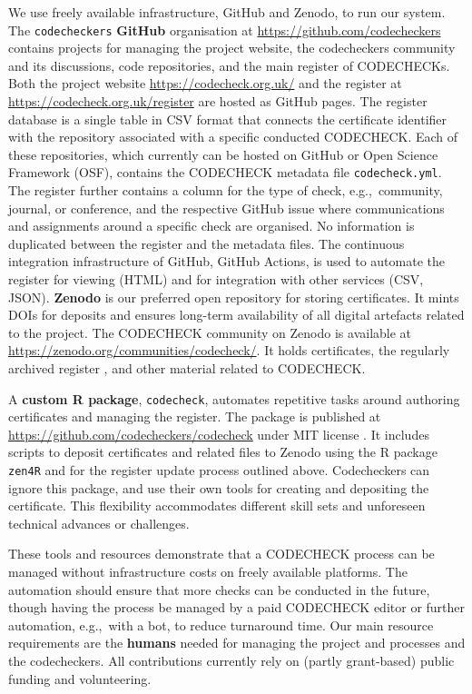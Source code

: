 \documentclass[12pt]{article}
\begin{document}
We use freely available infrastructure, GitHub and Zenodo, to run our
system.  The \texttt{codecheckers} \textbf{GitHub}
organisation at \url{https://github.com/codecheckers} contains
projects for managing the project website, the codecheckers community
and its discussions, code repositories, and the main register of
CODECHECKs. Both the project website \url{https://codecheck.org.uk/}
and the register at \url{https://codecheck.org.uk/register}
are hosted as GitHub pages.
The register database is a single table in CSV format that connects the
certificate identifier with the repository associated with a specific
conducted CODECHECK. Each of these repositories, which currently can
be hosted on GitHub or Open Science Framework (OSF), contains the
CODECHECK metadata file \texttt{codecheck.yml}. The register further
contains a column for the type of check, e.g.,~community, journal, or
conference, and the respective GitHub issue where communications and
assignments around a specific check are organised. No information is
duplicated between the register and the metadata files. The continuous
integration infrastructure of GitHub, GitHub Actions, is used to
automate the register for viewing (HTML) and for integration with
other services (CSV, JSON).  \textbf{Zenodo} is our preferred open repository for
storing certificates. It mints DOIs for deposits and ensures
long-term availability of all digital artefacts related to the
project. The CODECHECK community on Zenodo is available at
\url{https://zenodo.org/communities/codecheck/}. It holds
certificates, the regularly archived register
\cite{codecheck_register_jan2021}, and other material related to
CODECHECK.

A \textbf{custom R package}, \texttt{codecheck}, automates
repetitive tasks around authoring certificates and managing the
register. The package is published at
\url{https://github.com/codecheckers/codecheck} under MIT license
\cite{stephen_eglen_codecheckerscodecheck_2021}.
It includes scripts to deposit certificates and related
files to Zenodo using the R package \texttt{zen4R} \cite{zen4r} and
for the register update process outlined above.  Codecheckers can
ignore this package, and use their own tools for creating
and depositing the certificate.  This flexibility  accommodates
different skill sets and unforeseen technical advances or challenges.

These tools and resources demonstrate that a CODECHECK process can be
managed without infrastructure costs on freely available platforms.
The automation should ensure that more checks can be conducted in the
future, though having the process be managed by a paid CODECHECK
editor or further automation, e.g.,~with a bot, to reduce turnaround
time. Our main resource requirements are the \textbf{humans} needed for managing
the project and processes and the codecheckers.  All contributions
currently rely on (partly grant-based) public funding and
volunteering.
\end{document}
